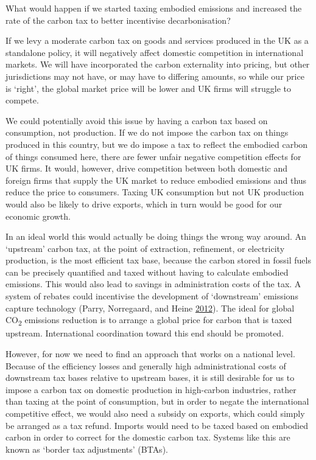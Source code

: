 \documentclass[]{tufte-handout}
\begin{document}
What would happen if we started taxing embodied emissions and increased
the rate of the carbon tax to better incentivise decarbonisation?

If we levy a moderate carbon tax on goods and services produced in the
UK as a standalone policy, it will negatively affect domestic
competition in international markets. We will have incorporated the
carbon externality into pricing, but other jurisdictions may not have,
or may have to differing amounts, so while our price is `right', the
global market price will be lower and UK firms will struggle to compete.

We could potentially avoid this issue by having a carbon tax based on
consumption, not production. If we do not impose the carbon tax on
things produced in this country, but we do impose a tax to reflect the
embodied carbon of things consumed here, there are fewer unfair negative
competition effects for UK firms. It would, however, drive competition
between both domestic and foreign firms that supply the UK market to
reduce embodied emissions and thus reduce the price to consumers. Taxing
UK consumption but not UK production would also be likely to drive
exports, which in turn would be good for our economic growth.

In an ideal world this would actually be doing things the wrong way
around. An `upstream' carbon tax, at the point of extraction,
refinement, or electricity production, is the most efficient tax base,
because the carbon stored in fossil fuels can be precisely quantified
and taxed without having to calculate embodied emissions. This would
also lead to savings in administration costs of the tax. A system of
rebates could incentivise the development of `downstream' emissions
capture technology (Parry, Norregaard, and Heine
\protect\hyperlink{ref-Parry2012}{2012}). The ideal for global
CO\textsubscript{2} emissions reduction is to arrange a global price for
carbon that is taxed upstream. International coordination toward this
end should be promoted.

However, for now we need to find an approach that works on a national
level. Because of the efficiency losses and generally high
administrational costs of downstream tax bases relative to upstream
bases, it is still desirable for us to impose a carbon tax on domestic
production in high-carbon industries, rather than taxing at the point of
consumption, but in order to negate the international competitive
effect, we would also need a subsidy on exports, which could simply be
arranged as a tax refund. Imports would need to be taxed based on
embodied carbon in order to correct for the domestic carbon tax. Systems
like this are known as `border tax adjustments' (BTAs).
\end{document}
